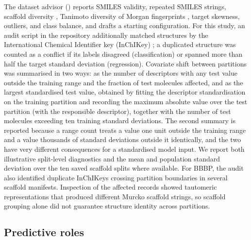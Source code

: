The dataset advisor () reports SMILES validity, repeated SMILES strings, scaffold diversity \cite{bemis1996scaffold}, Tanimoto diversity of Morgan fingerprints \cite{rogers2010ecfp,bajusz2015tanimoto}, target skewness, outliers, and class balance, and drafts a starting configuration. For this study, an audit script in the repository additionally matched structures by the International Chemical Identifier key (InChIKey) \cite{heller2015inchi}; a duplicated structure was counted as a conflict if its labels disagreed (classification) or spanned more than half the target standard deviation (regression). Covariate shift between partitions was summarised in two ways: as the number of descriptors with any test value outside the training range and the fraction of test molecules affected, and as the largest standardised test value, obtained by fitting the descriptor standardisation on the training partition and recording the maximum absolute value over the test partition (with the responsible descriptor), together with the number of test molecules exceeding ten training standard deviations. The second summary is reported because a range count treats a value one unit outside the training range and a value thousands of standard deviations outside it identically, and the two have very different consequences for a standardised model input. We report both illustrative split-level diagnostics and the mean and population standard deviation over the ten saved scaffold splits where available. For BBBP, the audit also identified duplicate InChIKeys crossing partition boundaries in several scaffold manifests. Inspection of the affected records showed tautomeric representations that produced different Murcko scaffold strings, so scaffold grouping alone did not guarantee structure identity across partitions.

\subsection{Predictive roles}\label{subsec:roles}

